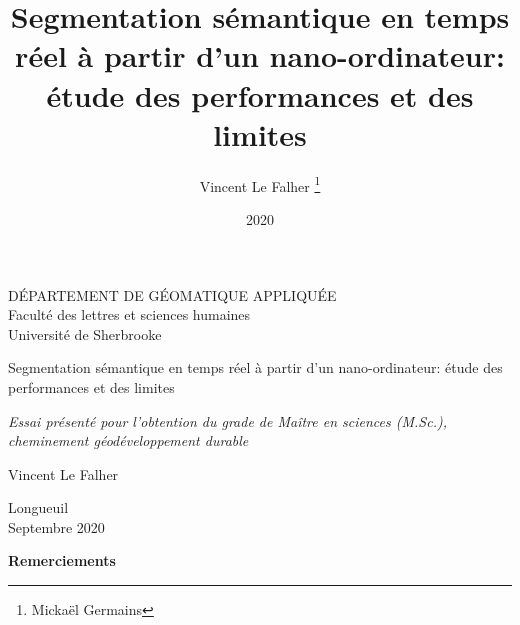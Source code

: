 \documentclass[12pt, letterpaper]{article}
\title{Segmentation sémantique en temps réel à partir d'un nano-ordinateur: étude des performances et des limites}
\author{Vincent Le Falher \thanks{Mickaël Germains}}
\date{2020}
\begin{document}
\begin{titlepage} %
   \centering %
 
   \scshape %

   DÉPARTEMENT DE GÉOMATIQUE APPLIQUÉE\\Faculté des lettres et sciences humaines\\Université de Sherbrooke

   \vspace{11\baselineskip}
 
   {\LARGE Segmentation sémantique en temps réel à partir d'un nano-ordinateur: étude des performances et des limites}
   \vspace{0.5\baselineskip}
   \linebreak
 
   \vspace*{3\baselineskip}
 
   \textit{Essai présenté pour l'obtention du grade de Maître en sciences (M.Sc.),\\cheminement géodéveloppement durable}

   \vspace{5\baselineskip}

   {\LARGE Vincent Le Falher}

   \vfill %
 
   Longueuil\\Septembre 2020 %
   \vfill %
   \tiny{}
 
\end{titlepage}
\thispagestyle{empty}
\noindent\textbf{Remerciements}

\newpage
{}
\tableofcontents{}
\listoffigures{}
\listoftables{}
\printglossary[title=Liste des abréviations, toctitle=Liste des abréviations, type=\acronymtype, nonumberlist]
\newpage
{}
% 
\end{document}
